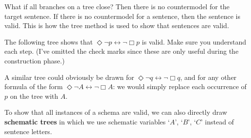 What if all branches on a tree close? Then there is no countermodel for the
target sentence. If there is no countermodel for a sentence, then the sentence
is valid. This is how the tree method is used to show that sentences are valid.

The following tree shows that
$\Diamond \neg p \leftrightarrow \neg \Box p$ is valid. Make sure you understand
each step. (I've omitted the check marks since these are only useful during the
construction phase.)

\begin{center}
\end{center}

A similar tree could obviously be drawn for
$\Diamond \neg q \leftrightarrow \neg \Box q$, and for any other formula of the
form $\Diamond \neg A \leftrightarrow \neg \Box A$: we would simply replace each
occurrence of $p$ on the tree with $A$.

To show that all instances of a schema are valid, we can also directly draw
\textbf{schematic trees} in which we use schematic variables `$A$', `$B$', `$C$'
instead of sentence letters.


